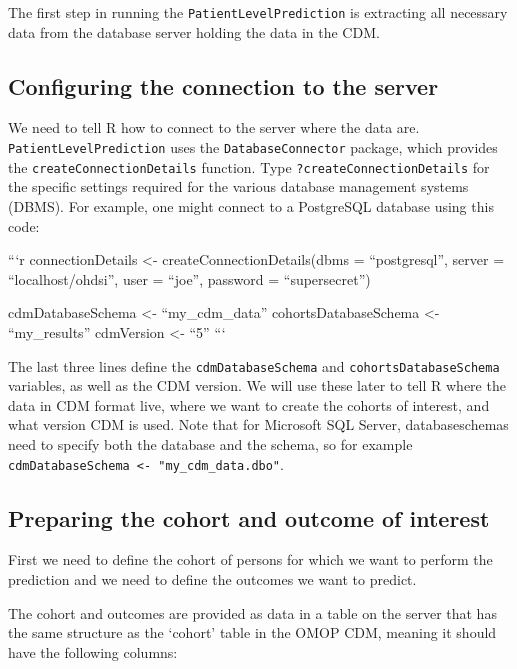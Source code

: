 \documentclass[]{article}
\begin{document}
The first step in running the \texttt{PatientLevelPrediction} is
extracting all necessary data from the database server holding the data
in the CDM.

\subsection{Configuring the connection to the
server}\label{configuring-the-connection-to-the-server}

We need to tell R how to connect to the server where the data are.
\texttt{PatientLevelPrediction} uses the \texttt{DatabaseConnector}
package, which provides the \texttt{createConnectionDetails} function.
Type \texttt{?createConnectionDetails} for the specific settings
required for the various database management systems (DBMS). For
example, one might connect to a PostgreSQL database using this code:

```r connectionDetails \textless{}- createConnectionDetails(dbms =
``postgresql'', server = ``localhost/ohdsi'', user = ``joe'', password =
``supersecret'')

cdmDatabaseSchema \textless{}- ``my\_cdm\_data'' cohortsDatabaseSchema
\textless{}- ``my\_results'' cdmVersion \textless{}- ``5'' ```

The last three lines define the \texttt{cdmDatabaseSchema} and
\texttt{cohortsDatabaseSchema} variables, as well as the CDM version. We
will use these later to tell R where the data in CDM format live, where
we want to create the cohorts of interest, and what version CDM is used.
Note that for Microsoft SQL Server, databaseschemas need to specify both
the database and the schema, so for example
\texttt{cdmDatabaseSchema\ \textless{}-\ "my\_cdm\_data.dbo"}.

\subsection{Preparing the cohort and outcome of
interest}\label{preparing-the-cohort-and-outcome-of-interest}

First we need to define the cohort of persons for which we want to
perform the prediction and we need to define the outcomes we want to
predict.

The cohort and outcomes are provided as data in a table on the server
that has the same structure as the `cohort' table in the OMOP CDM,
meaning it should have the following columns:
\end{document}

